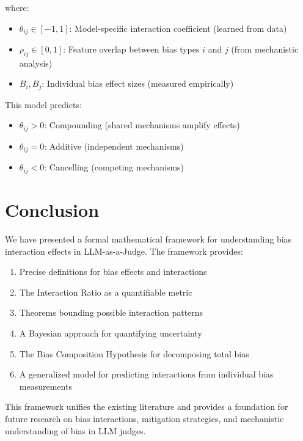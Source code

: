 \documentclass[11pt]{article}
\begin{document}
where:
\begin{itemize}
    \item $\theta_{ij} \in [-1, 1]$: Model-specific interaction coefficient (learned from data)
    \item $\rho_{ij} \in [0, 1]$: Feature overlap between bias types $i$ and $j$ (from mechanistic analysis)
    \item $B_i, B_j$: Individual bias effect sizes (measured empirically)
\end{itemize}

This model predicts:
\begin{itemize}
    \item $\theta_{ij} > 0$: Compounding (shared mechanisms amplify effects)
    \item $\theta_{ij} = 0$: Additive (independent mechanisms)
    \item $\theta_{ij} < 0$: Cancelling (competing mechanisms)
\end{itemize}

\section{Conclusion}

We have presented a formal mathematical framework for understanding bias interaction effects in LLM-as-a-Judge. The framework provides:
\begin{enumerate}
    \item Precise definitions for bias effects and interactions
    \item The Interaction Ratio as a quantifiable metric
    \item Theorems bounding possible interaction patterns
    \item A Bayesian approach for quantifying uncertainty
    \item The Bias Composition Hypothesis for decomposing total bias
    \item A generalized model for predicting interactions from individual bias measurements
\end{enumerate}

This framework unifies the existing literature and provides a foundation for future research on bias interactions, mitigation strategies, and mechanistic understanding of bias in LLM judges.
\end{document}
